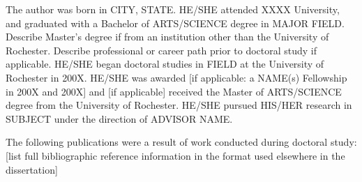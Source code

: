 

The author was born in CITY, STATE. HE/SHE attended XXXX University, and
graduated with a Bachelor of ARTS/SCIENCE degree in MAJOR FIELD. Describe
Master's degree if from an institution other than the University of
Rochester. Describe professional or career path prior to doctoral study if
applicable. HE/SHE began doctoral studies in FIELD at the University of
Rochester in 200X. HE/SHE was awarded [if applicable: a NAME(s) Fellowship in
200X and 200X] and [if applicable] received the Master of ARTS/SCIENCE degree
from the University of Rochester. HE/SHE pursued HIS/HER research in SUBJECT
under the direction of ADVISOR NAME.

\bigskip\noindent%
The following publications were a result of work conducted during doctoral
study: [list full bibliographic reference information in the format used
elsewhere in the dissertation]

